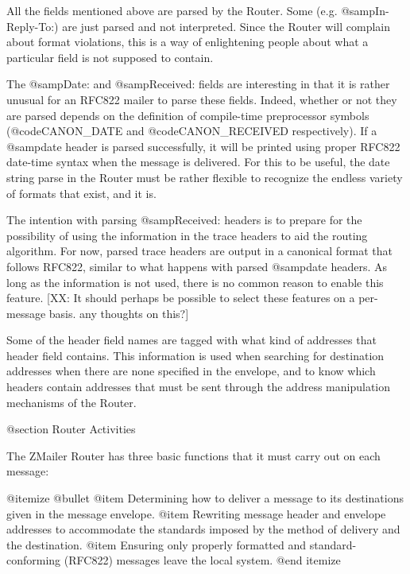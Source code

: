 {All the fields mentioned above are parsed by the Router.
Some (e.g. @samp{In-Reply-To:}) are just parsed and not interpreted.
Since the Router will complain about format violations, this is
a way of enlightening people about what a particular field is not
supposed to contain.

The @samp{Date:} and @samp{Received:} fields are interesting in that
it is rather unusual for an RFC822 mailer to parse these fields.
Indeed, whether or not they are parsed depends on the definition of
compile-time preprocessor symbols (@code{CANON_DATE} and
@code{CANON_RECEIVED} respectively).
If a @samp{date} header is parsed successfully, it will be printed using
proper RFC822 date-time syntax when the message is delivered.
For this to be useful, the date string parse in the Router must be
rather flexible to recognize the endless variety of formats that exist,
and it is.

The intention with parsing @samp{Received:} headers is to prepare for
the possibility of using the information in the trace headers to aid
the routing algorithm.
For now, parsed trace headers are output in a canonical format that
follows RFC822, similar to what happens with parsed @samp{date} headers.
As long as the information is not used, there is no common reason to
enable this feature.
[XX: It should perhaps be possible to select these features on
    a per-message basis. any thoughts on this?]

Some of the header field names are tagged with what kind of addresses
that header field contains.
This information is used when searching for destination addresses when
there are none specified in the envelope, and to know which headers
contain addresses that must be sent through the address manipulation
mechanisms of the Router.

@section Router Activities

The ZMailer Router has three basic functions that it must carry out on each
message:

@itemize @bullet
@item
Determining how to deliver a message to its destinations given in the
message envelope.
@item
Rewriting message header and envelope addresses to accommodate the standards
imposed by the method of delivery and the destination.
@item
Ensuring only properly formatted and standard-conforming (RFC822) messages
leave the local system.
@end itemize

}

